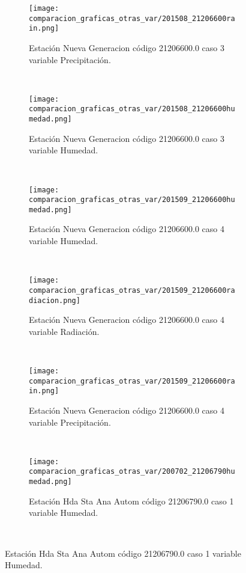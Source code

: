 \begin{figure}[H]
\centering
\begin{subfigure}[normla]{0.4\textwidth}
\caption{Estación Nueva Generacion código 21206600.0 caso 3 variable Precipitación.}
\texttt{[image: comparacion\_graficas\_otras\_var/201508\_21206600rain.png]}
\end{subfigure}
~
\begin{subfigure}[normla]{0.4\textwidth}
\caption{Estación Nueva Generacion código 21206600.0 caso 3 variable Humedad.}
\texttt{[image: comparacion\_graficas\_otras\_var/201508\_21206600humedad.png]}
\end{subfigure}
~
\begin{subfigure}[normla]{0.4\textwidth}
\caption{Estación Nueva Generacion código 21206600.0 caso 4 variable Humedad.}
\texttt{[image: comparacion\_graficas\_otras\_var/201509\_21206600humedad.png]}
\end{subfigure}
~
\begin{subfigure}[normla]{0.4\textwidth}
\caption{Estación Nueva Generacion código 21206600.0 caso 4 variable Radiación.}
\texttt{[image: comparacion\_graficas\_otras\_var/201509\_21206600radiacion.png]}
\end{subfigure}
~
\begin{subfigure}[normla]{0.4\textwidth}
\caption{Estación Nueva Generacion código 21206600.0 caso 4 variable Precipitación.}
\texttt{[image: comparacion\_graficas\_otras\_var/201509\_21206600rain.png]}
\end{subfigure}
~
\begin{subfigure}[normla]{0.4\textwidth}
\caption{Estación Hda Sta Ana Autom código 21206790.0 caso 1 variable Humedad.}
\texttt{[image: comparacion\_graficas\_otras\_var/200702\_21206790humedad.png]}
\end{subfigure}
~
\end{figure}
           
